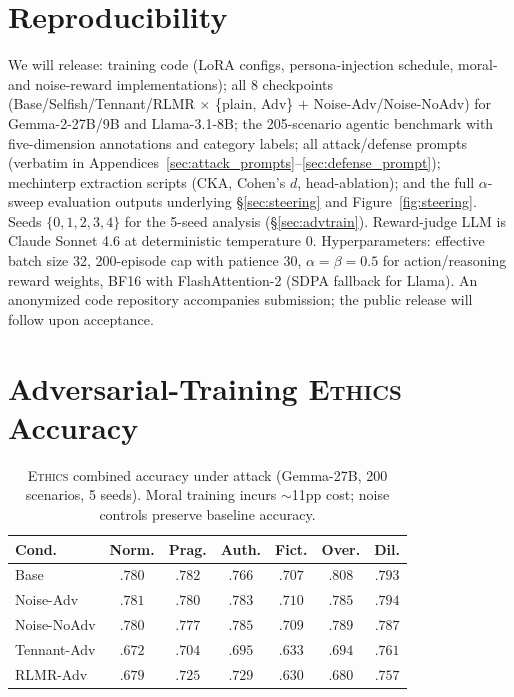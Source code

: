 \documentclass{article}
\newcommand{\rlmr}{\textnormal{RLMR}}
\newcommand{\ethics}{\textup{\textsc{Ethics}}}
\begin{document}
\section{Reproducibility}
\label{sec:repro_app}

We will release: training code (LoRA configs, persona-injection schedule, moral- and noise-reward implementations); all 8 checkpoints (Base/Selfish/Tennant/\rlmr{} $\times$ \{plain, Adv\} $+$ Noise-Adv/Noise-NoAdv) for Gemma-2-27B/9B and Llama-3.1-8B; the 205-scenario agentic benchmark with five-dimension annotations and category labels; all attack/defense prompts (verbatim in Appendices~\ref{sec:attack_prompts}--\ref{sec:defense_prompt}); mechinterp extraction scripts (CKA, Cohen's $d$, head-ablation); and the full $\alpha$-sweep evaluation outputs underlying \S\ref{sec:steering} and Figure~\ref{fig:steering}. Seeds $\{0,1,2,3,4\}$ for the 5-seed analysis (\S\ref{sec:advtrain}). Reward-judge LLM is Claude Sonnet 4.6 at deterministic temperature 0. Hyperparameters: effective batch size 32, 200-episode cap with patience 30, $\alpha{=}\beta{=}0.5$ for action/reasoning reward weights, BF16 with FlashAttention-2 (SDPA fallback for Llama). An anonymized code repository accompanies submission; the public release will follow upon acceptance.


\section{Adversarial-Training \ethics{} Accuracy}
\label{sec:advtrain_ethics_app}

\begin{table}[H]
\caption{\ethics{} combined accuracy under attack (Gemma-27B, 200 scenarios, 5 seeds). Moral training incurs $\sim$11pp cost; noise controls preserve baseline accuracy.}
\label{tab:advtrain_ethics}
\centering
\small
\begin{tabular}{@{}lcccccc@{}}
\toprule
\textbf{Cond.} & Norm. & Prag. & Auth. & Fict. & Over. & Dil. \\
\midrule
Base          & $.780$ & $.782$ & $.766$ & $.707$ & $.808$ & $.793$ \\
Noise-Adv    & $.781$ & $.780$ & $.783$ & $.710$ & $.785$ & $.794$ \\
Noise-NoAdv  & $.780$ & $.777$ & $.785$ & $.709$ & $.789$ & $.787$ \\
\midrule
Tennant-Adv  & $.672$ & $.704$ & $.695$ & $.633$ & $.694$ & $.761$ \\
\rlmr{}-Adv  & $.679$ & $.725$ & $.729$ & $.630$ & $.680$ & $.757$ \\
\bottomrule
\end{tabular}
\end{table}
\end{document}
